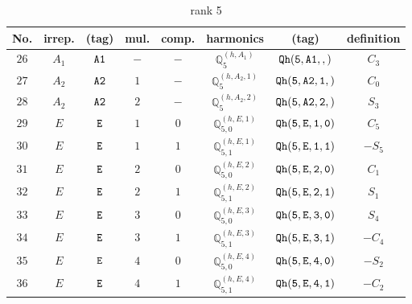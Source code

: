 \documentclass[fleqn,8pt]{jsarticle}
\begin{document}
\begin{table}[ht!]
\begin{center}
\caption{rank 5}
\renewcommand{\arraystretch}{1.3}
\begin{tabular}{cccccccc} \hline \hline
No. & irrep. & (tag) & mul. & comp. & harmonics & (tag) & definition \\ \hline
$ 26 $ & $ A_{1} $ & $ {\tt A1} $ & $ - $ & $ - $ & $ \mathbb{Q}_{5}^{(h,A_{1})} $ & $ {\tt Qh(5,A1,,)} $ & $ C_{3} $ \\
$ 27 $ & $ A_{2} $ & $ {\tt A2} $ & $ 1 $ & $ - $ & $ \mathbb{Q}_{5}^{(h,A_{2},1)} $ & $ {\tt Qh(5,A2,1,)} $ & $ C_{0} $ \\
$ 28 $ & $ A_{2} $ & $ {\tt A2} $ & $ 2 $ & $ - $ & $ \mathbb{Q}_{5}^{(h,A_{2},2)} $ & $ {\tt Qh(5,A2,2,)} $ & $ S_{3} $ \\
$ 29 $ & $ E $ & $ {\tt E} $ & $ 1 $ & $ 0 $ & $ \mathbb{Q}_{5,0}^{(h,E,1)} $ & $ {\tt Qh(5,E,1,0)} $ & $ C_{5} $ \\
$ 30 $ & $ E $ & $ {\tt E} $ & $ 1 $ & $ 1 $ & $ \mathbb{Q}_{5,1}^{(h,E,1)} $ & $ {\tt Qh(5,E,1,1)} $ & $ - S_{5} $ \\
$ 31 $ & $ E $ & $ {\tt E} $ & $ 2 $ & $ 0 $ & $ \mathbb{Q}_{5,0}^{(h,E,2)} $ & $ {\tt Qh(5,E,2,0)} $ & $ C_{1} $ \\
$ 32 $ & $ E $ & $ {\tt E} $ & $ 2 $ & $ 1 $ & $ \mathbb{Q}_{5,1}^{(h,E,2)} $ & $ {\tt Qh(5,E,2,1)} $ & $ S_{1} $ \\
$ 33 $ & $ E $ & $ {\tt E} $ & $ 3 $ & $ 0 $ & $ \mathbb{Q}_{5,0}^{(h,E,3)} $ & $ {\tt Qh(5,E,3,0)} $ & $ S_{4} $ \\
$ 34 $ & $ E $ & $ {\tt E} $ & $ 3 $ & $ 1 $ & $ \mathbb{Q}_{5,1}^{(h,E,3)} $ & $ {\tt Qh(5,E,3,1)} $ & $ - C_{4} $ \\
$ 35 $ & $ E $ & $ {\tt E} $ & $ 4 $ & $ 0 $ & $ \mathbb{Q}_{5,0}^{(h,E,4)} $ & $ {\tt Qh(5,E,4,0)} $ & $ - S_{2} $ \\
$ 36 $ & $ E $ & $ {\tt E} $ & $ 4 $ & $ 1 $ & $ \mathbb{Q}_{5,1}^{(h,E,4)} $ & $ {\tt Qh(5,E,4,1)} $ & $ - C_{2} $ \\
 \hline \hline
\end{tabular}
\end{center}
\end{table}
\end{document}
